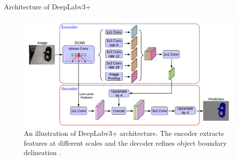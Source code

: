 \documentclass{beamer}
\begin{document}
\begin{frame}{Architecture of DeepLabv3+}
	
	\begin{figure}
		\centering
		\includegraphics[width=1\linewidth]{images/deepLabv4}
		\captionsetup{justification=centering,margin=0.2cm}
		\caption{An illustration of DeepLabv3+ architecture. The encoder extracts features at different scales and the decoder refines object boundary delineation \cite{DBLP:journals/corr/abs-1802-02611}.}
		\label{Fig:deepLabv4}
	\end{figure}

\end{frame}
\end{document}
